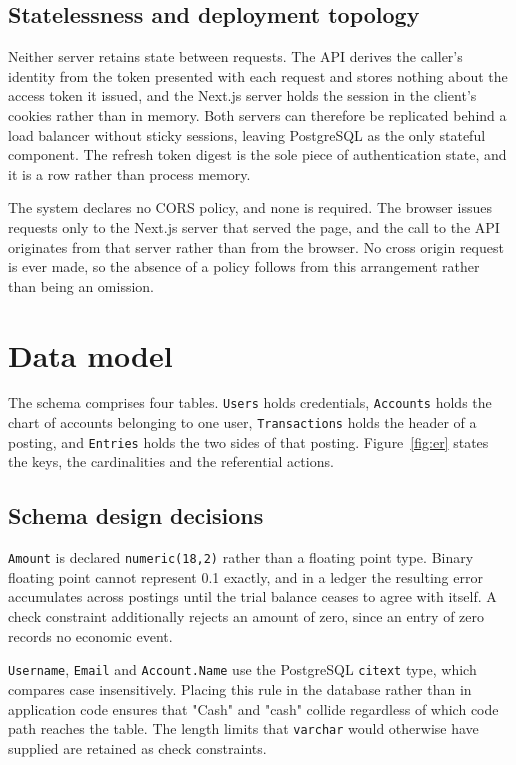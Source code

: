 \documentclass[11pt,a4paper]{article}
\newcommand{\code}[1]{\texttt{\fontsize{8.6}{10}\selectfont #1}}
\begin{document}
\subsection{Statelessness and deployment topology}

Neither server retains state between requests. The API derives the caller's
identity from the token presented with each request and stores nothing about the
access token it issued, and the Next.js server holds the session in the client's
cookies rather than in memory. Both servers can therefore be replicated behind a
load balancer without sticky sessions, leaving PostgreSQL as the only stateful
component. The refresh token digest is the sole piece of authentication state,
and it is a row rather than process memory.

The system declares no CORS policy, and none is required. The browser issues
requests only to the Next.js server that served the page, and the call to the
API originates from that server rather than from the browser. No cross origin
request is ever made, so the absence of a policy follows from this arrangement
rather than being an omission.

\section{Data model}

The schema comprises four tables. \code{Users} holds credentials,
\code{Accounts} holds the chart of accounts belonging to one user,
\code{Transactions} holds the header of a posting, and \code{Entries} holds the
two sides of that posting. Figure~\ref{fig:er} states the keys, the
cardinalities and the referential actions.

\subsection{Schema design decisions}\label{sec:schema}

\code{Amount} is declared \code{numeric(18,2)} rather than a floating point
type. Binary floating point cannot represent 0.1 exactly, and in a ledger the
resulting error accumulates across postings until the trial balance ceases to
agree with itself. A check constraint additionally rejects an amount of zero,
since an entry of zero records no economic event.

\code{Username}, \code{Email} and \code{Account.Name} use the PostgreSQL
\code{citext} type, which compares case insensitively. Placing this rule in the
database rather than in application code ensures that "Cash" and "cash" collide
regardless of which code path reaches the table. The length limits that
\code{varchar} would otherwise have supplied are retained as check constraints.
\end{document}
